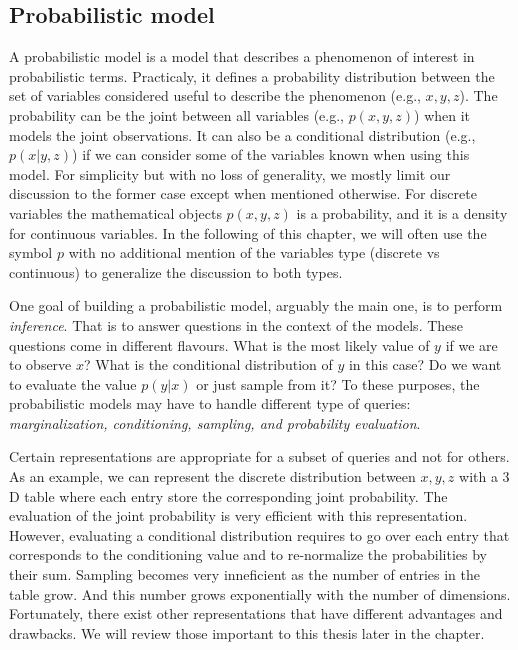 \subsection{Probabilistic model}
A probabilistic model is a model that describes a phenomenon of interest in probabilistic terms. Practicaly, it defines a probability distribution between the set of variables considered useful to describe the phenomenon (e.g., $x, y, z$). The probability can be the joint between all variables (e.g., $p(x, y, z)$) when it models the joint observations. It can also be a conditional distribution  (e.g., $p(x | y, z)$) if we can consider some of the variables known when using this model. For simplicity but with no loss of generality, we mostly limit our discussion to the former case except when mentioned otherwise. For discrete variables the mathematical objects $p(x, y, z)$ is a probability, and it is a density for continuous variables. In the following of this chapter, we will often use the symbol $p$ with no additional mention of the variables type (discrete vs continuous) to generalize the discussion to both types.

One goal of building a probabilistic model, arguably the main one, is to perform \textit{inference}. That is to answer questions in the context of the models. These questions come in different flavours. What is the most likely value of $y$ if we are to observe $x$? What is the conditional distribution of $y$ in this case? Do we want to evaluate the value $p(y|x)$ or just sample from it? To these purposes, the probabilistic models may have to handle different type of queries: \textit{marginalization, conditioning, sampling, and probability evaluation}.

Certain representations are appropriate for a subset of queries and not for others. As an example, we can represent the discrete distribution between $x, y, z$ with a $3$D table where each entry store the corresponding joint probability. The evaluation of the joint probability is very efficient with this representation. However, evaluating a conditional distribution requires to go over each entry that corresponds to the conditioning value and to re-normalize the probabilities by their sum. Sampling becomes very inneficient as the number of entries in the table grow. And this number grows exponentially with the number of dimensions. Fortunately, there exist other representations that have different advantages and drawbacks. We will review those important to this thesis later in the chapter.

